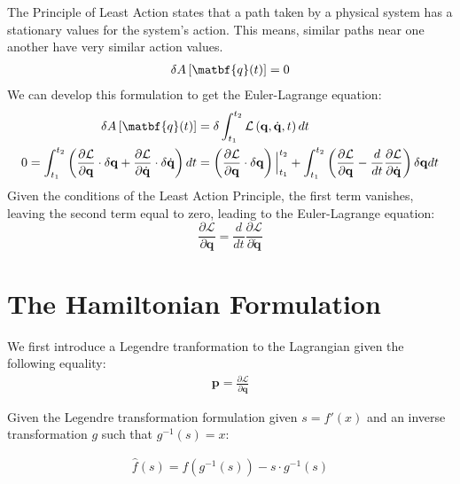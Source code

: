 \documentclass[draft]{agujournal2019}
\begin{document}
\begin{definition}
    The Principle of Least Action states that a path taken by a physical system has a stationary values for the system's action. This means, similar paths near one another have very similar action values.
    \begin{align}
        \delta A\left[ \matbf{q}(t) \right] = 0
    \end{align}
    We can develop this formulation to get the Euler-Lagrange equation:
    \begin{align}
        \delta A\left[ \matbf{q}(t) \right] &= \delta \int_{t_1}^{t_2} \mathcal{L}\left(\mathbf{q}, \dot{\mathbf{q}}, t\right) dt \\
        0 = \int_{t_1}^{t_2} \left( \frac{\partial \mathcal{L}}{\partial \mathbf{q}} \cdot \delta \mathbf{q} + \frac{\partial \mathcal{L}}{\partial \dot{\mathbf{q}}} \cdot \delta \dot{\mathbf{q}} \right)dt &= \left( \frac{\partial \mathcal{L}}{\partial \mathbf{q}} \cdot \delta \mathbf{q} \right) \Big|_{t_1}^{t_2} + \int_{t_1}^{t_2} \left( \frac{\partial \mathcal{L}}{\partial \mathbf{q}} - \frac{d}{dt} \frac{\partial \mathcal{L}}{\partial \dot{\mathbf{q}}}  \right) \delta \mathbf{q} dt
    \end{align}
    Given the conditions of the Least Action Principle, the first term vanishes, leaving the second term equal to zero, leading to the Euler-Lagrange equation:
    \begin{equation}
        \frac{\partial \mathcal{L}}{\partial \mathbf{q}} = \frac{d}{dt} \frac{\partial \mathcal{L}}{\partial \dot{\mathbf{q}}}
    \end{equation}
\end{definition}

\section{The Hamiltonian Formulation}
We first introduce a Legendre tranformation to the Lagrangian given the following equality:
\begin{align}
    \mathbf{p} = \frac{\partial \mathcal{L}}{\partial \mathbf{q}}
\end{align}

Given the Legendre transformation formulation given $s = f'(x)$ and an inverse transformation $g$ such that $g^{-1}(s) = x$:

\begin{align}
    \hat{f}(s) = f(g^{-1}(s)) - s \cdot g^{-1}(s)
\end{align}
\end{document}
